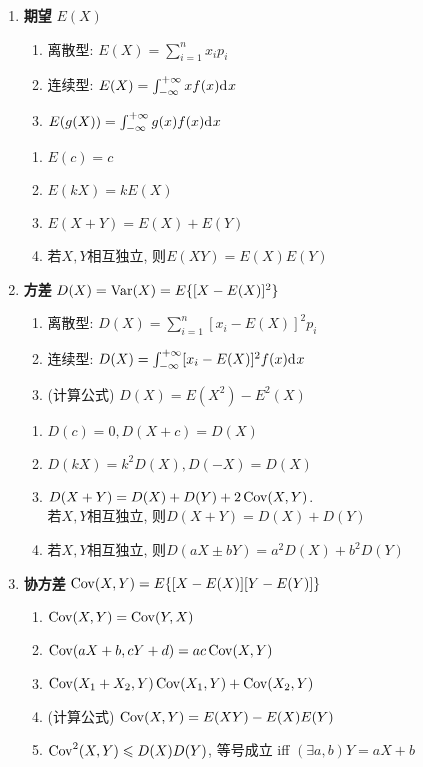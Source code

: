 \begin{enumerate}

\item {\bf 期望} $E(X)$
\begin{enumerate}
\item 离散型: $E(X)=\sum_{i=1}^n x_i p_i$
\item 连续型: $E(X)=\int_{-\infty}^{+\infty}xf(x){\mathrm{d}\:\!} x$
\item $E(g(X))=\int_{-\infty}^{+\infty}g(x)f(x){\mathrm{d}\:\!} x$
\end{enumerate}
\begin{enumerate}[label={\sf 性质\arabic*}]
\item $E(c) = c$
\item $E(kX) = kE(X)$
\item $E(X+Y) = E(X)+E(Y)$
\item 若$X,Y$相互独立, 则$E(XY) = E(X)E(Y)$
\end{enumerate}

\item {\bf 方差} $D(X)=\operatorname{Var}(X)=E\{[X-E(X)]^2\}$
\begin{enumerate}
\item 离散型: $D(X)=\sum_{i=1}^n [x_i-E(X)]^2 p_i$
\item 连续型: $D(X)=\int_{-\infty}^{+\infty}[x_i-E(X)]^2 f(x){\mathrm{d}\:\!} x$
\item (计算公式) $D(X)=E(X^2)-E^2(X)$
\end{enumerate}
\begin{enumerate}[label={\sf 性质\arabic*}]
\item $D(c) = 0, D(X+c)=D(X)$
\item $D(kX) = k^2 D(X), D(-X)=D(X)$
\item $D(X+Y) = D(X)+D(Y)+2\operatorname{Cov}(X,Y)$. \\若$X,Y$相互独立, 则$D(X+Y) = D(X)+D(Y)$
\item 若$X,Y$相互独立, 则$D(aX\pm bY)=a^2 D(X)+b^2 D(Y)$
\end{enumerate}

\item {\bf 协方差} $\operatorname{Cov}(X,Y)=E\{[X-E(X)][Y-E(Y)]\}$
\begin{enumerate}[label={\sf 性质\arabic*}]
\item $\operatorname{Cov}(X,Y)=\operatorname{Cov}(Y,X)$
\item $\operatorname{Cov}(aX+b,cY+d)=ac\operatorname{Cov}(X,Y)$
\item $\operatorname{Cov}(X_1+X_2,Y)\operatorname{Cov}(X_1,Y)+\operatorname{Cov}(X_2,Y)$
\item (计算公式) $\operatorname{Cov}(X,Y)=E(XY)-E(X)E(Y)$
\item $\operatorname{Cov}^2(X,Y)\leqslant D(X)D(Y)$, 等号成立 iff $(\exists a,b) Y=aX+b$
\end{enumerate}


\end{enumerate}
